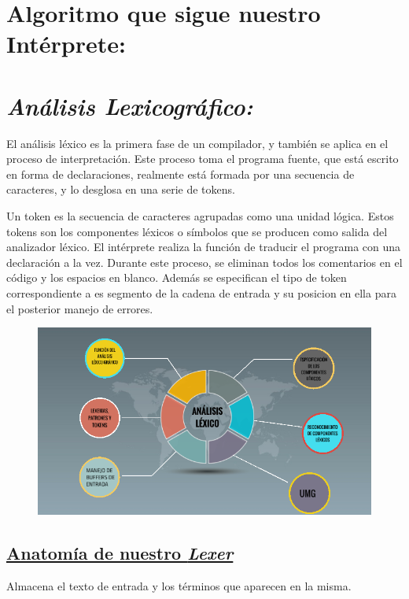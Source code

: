 \documentclass{article}%
\begin{document}
\section*{Algoritmo que sigue nuestro Intérprete: }

\section{\emph{Análisis Lexicográfico:}}


El análisis léxico es la primera fase de un compilador, y también se aplica en el proceso de interpretación. Este proceso toma el programa fuente, que está escrito en forma de declaraciones, realmente está formada por una secuencia de
caracteres, y lo desglosa en una serie de tokens.

Un token es la secuencia de caracteres agrupadas como una unidad lógica. Estos tokens son los componentes léxicos o símbolos que se producen como salida del analizador léxico.
El intérprete realiza la función de traducir el programa con una declaración a la vez. Durante este proceso, se eliminan todos los comentarios en el código y los espacios en blanco.
Además se especifican el tipo de token correspondiente a es segmento de la cadena de entrada y su posicion en ella para el posterior manejo de errores.
\begin{figure}[h]
    \begin{center}
        \includegraphics*[width=15cm]{lexer.png}
        
    \end{center}   
\end{figure}
\subsection{\underline{Anatomía de nuestro \emph{Lexer}}}
Almacena el texto de entrada y los términos que aparecen en la misma.
\end{document}
